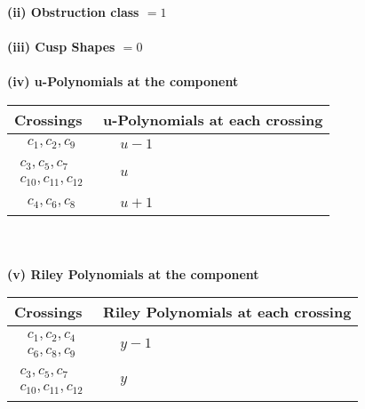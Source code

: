 \documentclass[1p]{elsarticle_modified}
\theoremstyle{definition}
\begin{document}
\flushleft \textbf{(ii) Obstruction class $= 1$}\\~\\
\flushleft \textbf{(iii) Cusp Shapes $= 0$}\\~\\
\newpage\renewcommand{\arraystretch}{1}
\flushleft \textbf{(iv) u-Polynomials at the component}\newline \\
\begin{tabular}{m{50pt}|m{274pt}}
Crossings & \hspace{64pt}u-Polynomials at each crossing \\
\hline $$\begin{aligned}c_{1},c_{2},c_{9}\end{aligned}$$&$\begin{aligned}
&u-1
\end{aligned}$\\
\hline $$\begin{aligned}c_{3},c_{5},c_{7}\\c_{10},c_{11},c_{12}\end{aligned}$$&$\begin{aligned}
&u
\end{aligned}$\\
\hline $$\begin{aligned}c_{4},c_{6},c_{8}\end{aligned}$$&$\begin{aligned}
&u+1
\end{aligned}$\\
\hline
\end{tabular}\\~\\
\newpage\renewcommand{\arraystretch}{1}
\flushleft \textbf{(v) Riley Polynomials at the component}\newline \\
\begin{tabular}{m{50pt}|m{274pt}}
Crossings & \hspace{64pt}Riley Polynomials at each crossing \\
\hline $$\begin{aligned}c_{1},c_{2},c_{4}\\c_{6},c_{8},c_{9}\end{aligned}$$&$\begin{aligned}
&y-1
\end{aligned}$\\
\hline $$\begin{aligned}c_{3},c_{5},c_{7}\\c_{10},c_{11},c_{12}\end{aligned}$$&$\begin{aligned}
&y
\end{aligned}$\\
\hline
\end{tabular}\\~\\
\end{document}
